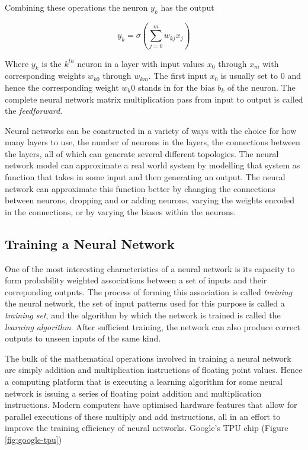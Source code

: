 Combining these operations the neuron $y_k$ has the output

\begin{equation}
	y_k = \sigma \left( \sum_{j=0}^m w_{kj} x_j \right)
\end{equation}

Where $y_k$ is the $k^{th}$ neuron in a layer with input values $x_0$ through $x_m$ with corresponding weights $w_{k0}$ through $w_{km}$. The first input $x_0$ is usually set to $0$ and hence the corresponding weight $w_k0$ stands in for the bias $b_k$ of the neuron. The complete neural network matrix multiplication pass from input to output is called the \textit{feedforward}.

Neural networks can be constructed in a variety of ways with the choice for how many layers to use, the number of neurons in the layers, the connections between the layers, all of which can generate several different topologies. The neural network model can approximate a real world system by modelling that system as function that takes in some input and then generating an output. The neural network can approximate this function better by changing the connections between neurons, dropping and or adding neurons, varying the weights encoded in the connections, or by varying the biases within the neurons.

\subsection{Training a Neural Network}

One of the most interesting characteristics of a neural network is its capacity to form probability weighted associations between a set of inputs and their correponding outputs. The process of forming this association is called \textit{training} the neural network, the set of input patterns used for this purpose is called a \textit{training set}, and the algorithm by which the network is trained is called the \textit{learning algorithm}. After sufficient training, the network can also produce correct outputs to unseen inputs of the same kind.

The bulk of the mathematical operations involved in training a neural network are simply addition and multiplication instructions of floating point values. Hence a computing platform that is executing a learning algorithm for some neural network is issuing a series of floating point addition and multiplication instructions. Modern computers have optimised hardware features that allow for parallel executions of these multiply and add instructions, all in an effort to improve the training efficiency of neural networks. Google's TPU chip (Figure \ref{fig:google-tpu})

